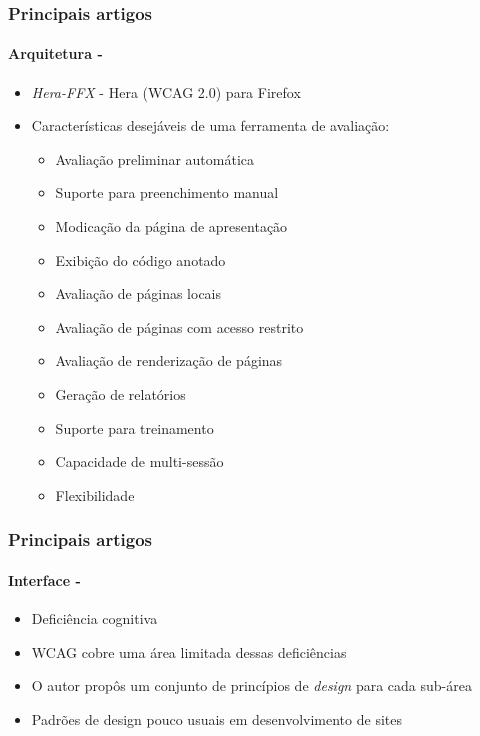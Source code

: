 \documentclass{beamer}
\begin{document}
\begin{frame}
\frametitle{Principais artigos}
\framesubtitle{Arquitetura - \citet{Fuertes:2011:DHW:1969289.1969294}}

\begin{itemize}
  \item \textit{Hera-FFX} - Hera (WCAG 2.0) para Firefox
  \item Características desejáveis de uma ferramenta de avaliação:
  	\begin{multicols}{2}
  	\begin{itemize}
  	 	\item Avaliação preliminar automática
  	 	\item Suporte para preenchimento manual
  	 	\item Modicação da página de apresentação
  	 	\item Exibição do código anotado
  	 	\item Avaliação de páginas locais
  	 	\item Avaliação de páginas com acesso restrito
  	 	\item Avaliação de renderização de páginas
  	 	\item Geração de relatórios
  	 	\item Suporte para treinamento
  	 	\item Capacidade de multi-sessão
  	 	\item Flexibilidade
  	 \end{itemize}
  	\end{multicols}
\end{itemize}

\end{frame}

\begin{frame}
\frametitle{Principais artigos}
\framesubtitle{Interface - \citet{Halbach:2010:TCA:1747589.1747607}}

\begin{itemize}
  \item Deficiência cognitiva
  \item WCAG cobre uma área limitada dessas deficiências
  \item O autor propôs um conjunto de princípios de \textit{design} para cada sub-área
  \item Padrões de design pouco usuais em desenvolvimento de sites
\end{itemize}

\end{frame}
\end{document}
